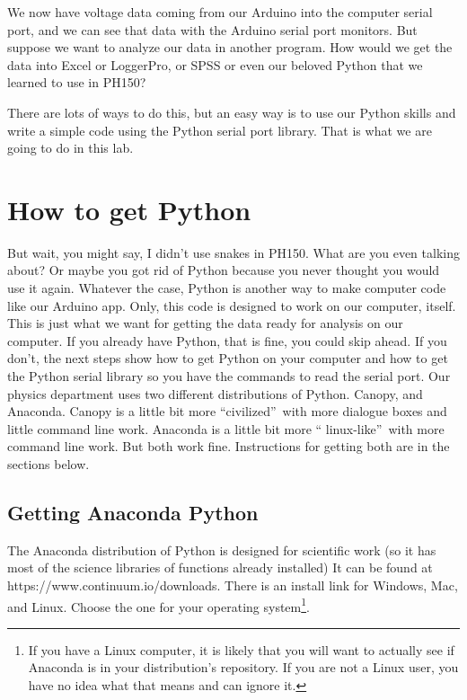 We now have voltage data coming from our Arduino into the computer serial
port, and we can see that data with the Arduino serial port monitors. But
suppose we want to analyze our data in another program. How would we get the
data into Excel or LoggerPro, or SPSS or even our beloved Python that we
learned to use in PH150?

There are lots of ways to do this, but an easy way is to use our Python
skills and write a simple code using the Python serial port library. That is
what we are going to do in this lab.

\section{How to get Python}

But wait, you might say, I didn't use snakes in PH150. What are you even
talking about? Or maybe you got rid of Python because you never thought you
would use it again. Whatever the case, Python is another way to make
computer code like our Arduino app. Only, this code is designed to work on
our computer, itself. This is just what we want for getting the data ready
for analysis on our computer. If you already have Python, that is fine, you
could skip ahead. If you don't, the next steps show how to get Python on
your computer and how to get the Python serial library so you have the
commands to read the serial port. Our physics department uses two different
distributions of Python. Canopy, and Anaconda. Canopy is a little bit more
\textquotedblleft civilized\textquotedblright\ with more dialogue boxes and
little command line work. Anaconda is a little bit more \textquotedblleft
linux-like\textquotedblright\ with more command line work. But both work
fine. Instructions for getting both are in the sections below.

\subsection{Getting Anaconda Python}

The Anaconda distribution of Python is designed for scientific work (so it
has most of the science libraries of functions already installed) It can be
found at https://www.continuum.io/downloads. There is an install link for
Windows, Mac, and Linux. Choose the one for your operating system\footnote{%
If you have a Linux computer, it is likely that you will want to actually
see if Anaconda is in your distribution's repository. If you are not a Linux
user, you have no idea what that means and can ignore it.}.

